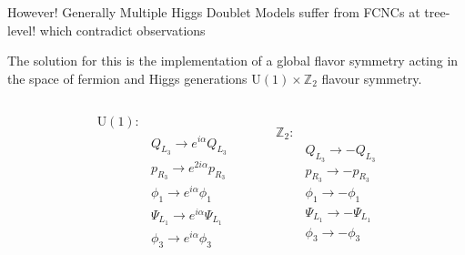 \documentclass[10pt,xcolor=dvipsnames,mathserif]{beamer}
\newcommand{\green}[0]{\color{ForestGreen}}
\newcommand{\red}[0]{\color{red}}
\begin{document}
\begin{frame} 
\begin{center}
    {\red However! Generally Multiple Higgs Doublet Models suffer from FCNCs at tree-level! which contradict observations} 
\end{center}
 
\begin{center}
    {\green The solution for this is the implementation of a global flavor symmetry acting in the space of fermion and Higgs generations $\mathrm{U(1)}\times\mathbb{Z}_2$ flavour symmetry.} %
\end{center}
\begin{columns}
    
\end{columns}
    \begin{equation*}
    \label{eq:3HDM_Transformations}
    \begin{split} 
    \mathrm{U(1)} : & \\
    & Q_{L_3} \rightarrow    e^{i \alpha} Q_{L_3}  \\  
    & p_{R_3} \rightarrow    e^{2 i \alpha} p_{R_3}  \\
    & \phi_1  \rightarrow    e^{i \alpha} \phi_1  \\   
    & \Psi_{L_1} \rightarrow e^{i \alpha} \Psi_{L_1} \\
    & \phi_3 \rightarrow     e^{i \alpha} \phi_3  \\ 
    \end{split} \quad \quad \quad  
    \begin{split}
    \mathbb{Z}_2 : & \\
    & Q_{L_3} \rightarrow -Q_{L_3} \\
    & p_{R_3} \rightarrow -p_{R_3} \\ 
    & \phi_1  \rightarrow -\phi_1 \\ 
    & \Psi_{L_1} \rightarrow - \Psi_{L_1} \\ 
    & \phi_3 \rightarrow -\phi_3
    \end{split}  
    \end{equation*} 
\end{frame}
\end{document}
